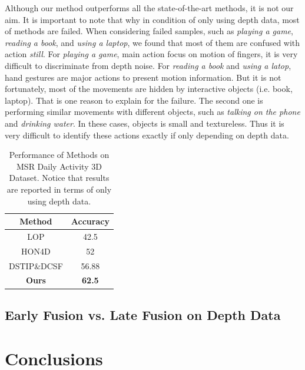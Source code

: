 \documentclass[review]{elsarticle}
\begin{document}
Although our method outperforms all the state-of-the-art methods, it is not our aim. It is important to note that why in condition of only using depth data, most of methods are failed. When considering failed samples, such as \textit{playing a game}, \textit{reading a book}, and \textit{using a laptop}, we found that most of them are confused with action \textit{still}. For \textit{playing a game}, main action focus on motion of fingers, it is very difficult to discriminate from depth noise. For \textit{reading a book} and \textit{using a latop}, hand gestures are major actions to present motion information. But it is not fortunately, most of the movements are hidden by interactive objects (i.e. book, laptop). That is one reason to explain for the failure. The second one is performing similar movements with different objects, such as \textit{talking on the phone} and \textit{drinking water}. In these cases, objects is small and textureless. Thus it is very difficult to identify these actions exactly if only depending on depth data.

\begin{table}[H]
	\begin{center}
		\begin{tabular}{c|c}
		
		{\bf Method} & {\bf Accuracy} \\
		\hline
		       LOP \cite{wang2012mining} &       42.5 \\
		
		     HON4D \cite{oreifej2013hon4d} &         52 \\
		
		DSTIP\&DCSF \cite{xia2013spatio} &      56.88 \\
		\hline
		{\bf Ours} & {\bf 62.5} \\
		
		\end{tabular}
	\end{center}
	\caption{\label{lbl:Table_Daily3D}Performance of Methods on MSR Daily Activity 3D Dataset. Notice that results are reported in terms of only using depth data.}
\end{table}

\subsection{Early Fusion vs. Late Fusion on Depth Data}


\section{Conclusions}
\label{lbl:Conclusions}
\end{document}

